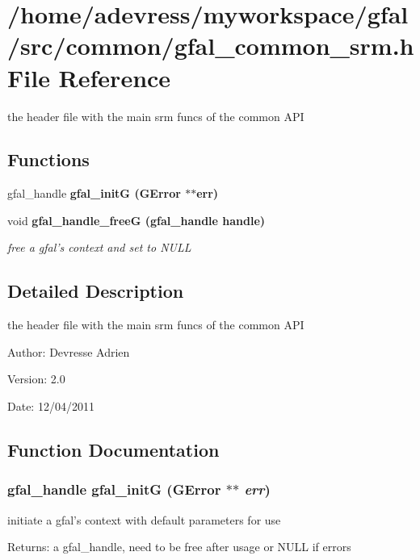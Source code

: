 \section{/home/adevress/myworkspace/gfal/src/common/gfal\_\-common\_\-srm.h File Reference}
\label{gfal__common__srm_8h}
the header file with the main srm funcs of the common API 

\subsection*{Functions}
\begin{CompactItemize}
\item 
gfal\_\-handle \bf{gfal\_\-init\-G} (GError $\ast$$\ast$err)
\item 
void \bf{gfal\_\-handle\_\-free\-G} (gfal\_\-handle handle)\label{gfal__common__srm_8h_9dbd943eaed291897d852fc3ae560058}

\begin{CompactList}\small\item\em free a gfal's context and set to NULL \item\end{CompactList}\end{CompactItemize}


\subsection{Detailed Description}
the header file with the main srm funcs of the common API 

\begin{Desc}
\item[Author:]Devresse Adrien \end{Desc}
\begin{Desc}
\item[Version:]2.0 \end{Desc}
\begin{Desc}
\item[Date:]12/04/2011 \end{Desc}


\subsection{Function Documentation}
\subsubsection{\setlength{\rightskip}{0pt plus 5cm}gfal\_\-handle gfal\_\-init\-G (GError $\ast$$\ast$ {\em err})}\label{gfal__common__srm_8h_8410ba458f920d8f8a8f0e5594170fe4}


initiate a gfal's context with default parameters for use \begin{Desc}
\item[Returns:]a gfal\_\-handle, need to be free after usage or NULL if errors \end{Desc}
